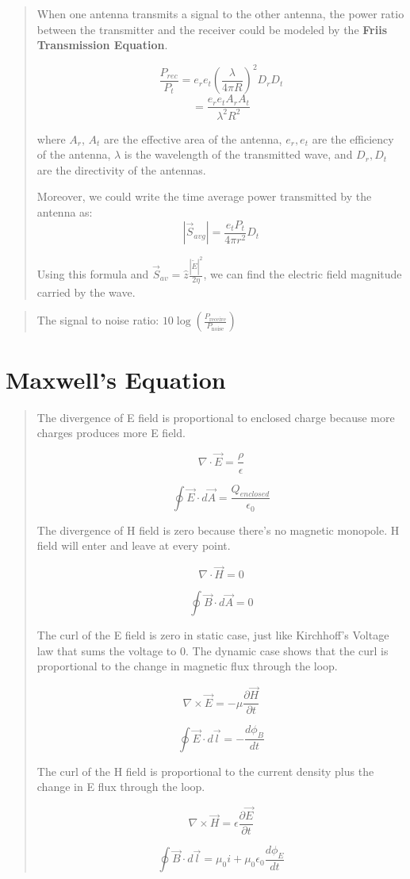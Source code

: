 \documentclass{article} %
\begin{document}
\begin{quote}
    When one antenna transmits a signal to the other antenna, the power ratio between the transmitter and the receiver could be modeled by the \textbf{Friis Transmission Equation}.

    \[\frac{P_{rec}}{P_{t}} = e_r e_t \left(\frac{\lambda}{4\pi R}\right)^2 D_r D_t\]
    \[= \frac{e_r e_t A_r A_t}{\lambda^2 R^2}\]

    where $A_r$, $A_t$ are the effective area of the antenna, $e_r, e_t$ are the efficiency of the antenna, $\lambda$ is the wavelength of the transmitted wave, and $D_r, D_t$ are the directivity of the antennas.

    Moreover, we could write the time average power transmitted by the antenna as:
    \[|\vec{S}_{avg}| = \frac{e_t P_{t}}{4 \pi r^2}D_t\]

    Using this formula and $\vec{S}_{av} = \hat{z}\frac{|\widetilde{E}|^2}{2 \eta}$, we can find the electric field magnitude carried by the wave.

\end{quote}

\begin{quote}
    The signal to noise ratio: $10 \log\left(\frac{P_{\text{receive}}}{P_{\text{noise}}}\right)$
\end{quote}

\section{Maxwell's Equation}
\begin{quote}

    The divergence of E field is proportional to enclosed charge because more charges produces more E field.

    $$\nabla \cdot \vec{E} = \frac{\rho}{\epsilon}$$

    $$\oint \vec{E} \cdot d\vec{A} = \frac{Q_{enclosed}}{\epsilon_0}$$


    The divergence of H field is zero because there's no magnetic monopole. H field will enter and leave at every point.

    $$\nabla \cdot \vec{H} = 0$$

    $$\oint \vec{B} \cdot d\vec{A} = 0$$

    The curl of the E field is zero in static case, just like Kirchhoff's Voltage law that sums the voltage to 0. The dynamic case shows that the curl is proportional to the change in magnetic flux through the loop.

    $$\nabla \times \vec{E} = -\mu \frac{\partial \vec{H}}{\partial t}$$

    $$\oint \vec{E} \cdot d\vec{l} = -\frac{d\phi_B}{dt}$$

    The curl of the H field is proportional to the current density plus the change in E flux through the loop.

    $$\nabla \times \vec{H} = \epsilon \frac{\partial \vec{E}}{\partial t}$$

    $$\oint \vec{B} \cdot d\vec{l} = \mu_0 i + \mu_0 \epsilon_0 \frac{d \phi_E}{dt}$$
\end{quote}
\end{document}
